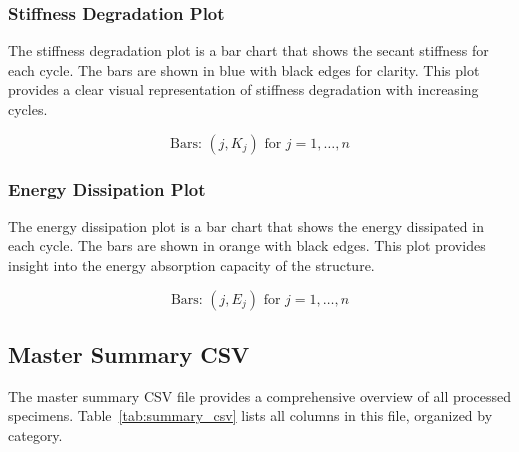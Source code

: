 \documentclass[11pt,a4paper]{article}
\begin{document}
\subsubsection{Stiffness Degradation Plot}

The stiffness degradation plot is a bar chart that shows the secant stiffness for each cycle. The bars are shown in blue with black edges for clarity. This plot provides a clear visual representation of stiffness degradation with increasing cycles.

\begin{equation}
\text{Bars: } (j, K_j) \text{ for } j = 1, \ldots, n
\label{eq:stiffness_plot}
\end{equation}

\subsubsection{Energy Dissipation Plot}

The energy dissipation plot is a bar chart that shows the energy dissipated in each cycle. The bars are shown in orange with black edges. This plot provides insight into the energy absorption capacity of the structure.

\begin{equation}
\text{Bars: } (j, E_j) \text{ for } j = 1, \ldots, n
\label{eq:energy_plot}
\end{equation}

\subsection{Master Summary CSV}

The master summary CSV file provides a comprehensive overview of all processed specimens. Table~\ref{tab:summary_csv} lists all columns in this file, organized by category.
\end{document}
